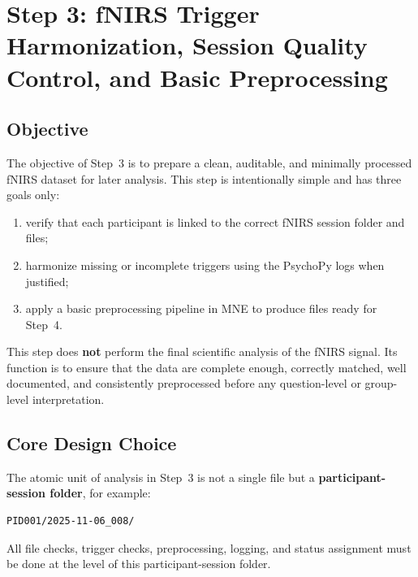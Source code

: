 \section{Step 3: fNIRS Trigger Harmonization, Session Quality Control, and Basic Preprocessing}
\label{sec:step3_fnirs}

\subsection{Objective}
The objective of Step~3 is to prepare a clean, auditable, and minimally processed fNIRS dataset
for later analysis.
This step is intentionally simple and has three goals only:
\begin{enumerate}
    \item verify that each participant is linked to the correct fNIRS session folder and files;
    \item harmonize missing or incomplete triggers using the PsychoPy logs when justified;
    \item apply a basic preprocessing pipeline in MNE to produce files ready for Step~4.
\end{enumerate}

This step does \textbf{not} perform the final scientific analysis of the fNIRS signal.
Its function is to ensure that the data are complete enough, correctly matched, well documented,
and consistently preprocessed before any question-level or group-level interpretation.

\subsection{Core Design Choice}
The atomic unit of analysis in Step~3 is not a single file but a
\textbf{participant-session folder}, for example:
\begin{verbatim}
PID001/2025-11-06_008/
\end{verbatim}

All file checks, trigger checks, preprocessing, logging, and status assignment must be done
at the level of this participant-session folder.

